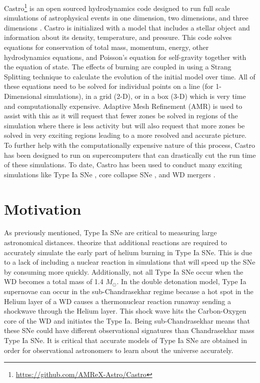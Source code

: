 \documentclass[preprint]{aastex62}
\begin{document}
    Castro\footnote{\url{https://github.com/AMReX-Astro/Castro}} is an open sourced hydrodynamics code designed to run full scale simulations of astrophysical events in one dimension, two dimensions, and three dimensions \citep{castro}. Castro is initialized with a model that includes a stellar object and information about its density, temperature, and pressure. This code solves equations for conservation of total mass, momentum, energy, other hydrodynamics equations, and Poisson's equation for self-gravity together with the equation of state. The effects of burning are coupled in using a Strang Splitting technique \citep{strang} to calculate the evolution of the initial model over time. All of these equations need to be solved for individual points on a line (for 1-Dimensional simulations), in a grid (2-D), or in a box (3-D) which is very time and computationally expensive. Adaptive Mesh Refinement (AMR) is used to assist with this as it will request that fewer zones be solved in regions of the simulation where there is less activity but will also request that more zones be solved in very exciting regions leading to a more resolved and accurate picture. To further help with the computationally expensive nature of this process, Castro has been designed to run on supercomputers that can drastically cut the run time of these simulations. To date, Castro has been used to conduct many exciting simulations like Type Ia SNe \citep{subch1, subch2}, core collapse SNe \citep{corecollapse1, corecollapse2}, and WD mergers \citep{merger}. 
  
\section{Motivation}
  
  As previously mentioned, Type Ia SNe are critical to measuring large astronomical distances. \citet{shenNbildsten} theorize that additional reactions are required to accurately simulate the early part of helium burning in Type Ia SNe. This is due to a lack of including a nuclear reaction in simulations that will speed up the SNe by consuming  more quickly. Additionally, not all Type Ia SNe occur when the WD becomes a total mass of 1.4 $M_{\odot}$. In the double detonation model, Type Ia supernovae can occur in the sub-Chandrasekhar regime because a hot spot in the Helium layer of a WD causes a thermonuclear reaction runaway sending a shockwave through the Helium layer. This shock wave hits the Carbon-Oxygen core of the WD and initiates the Type Ia. Being sub-Chandrasekhar means that these SNe could have different observational signatures than Chandrasekhar mass Type Ia SNe. It is critical that accurate models of Type Ia SNe are obtained in order for observational astronomers to learn about the universe accurately. 
  
\end{document}

